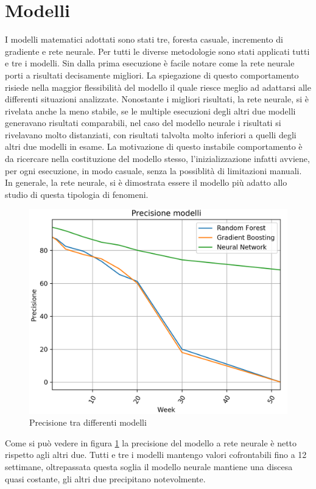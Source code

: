 \documentclass[%
    corpo=12pt,
    twoside,
    oldstyle,
    autoretitolo,
    greek,
    evenboxes,
]{toptesi}
\begin{document}
\section{Modelli}
I modelli matematici adottati sono stati tre, foresta casuale, incremento di gradiente e rete neurale. Per tutti le diverse metodologie sono stati applicati tutti e tre i modelli. Sin dalla prima esecuzione è facile notare come la rete neurale porti a risultati decisamente migliori. La spiegazione di questo comportamento risiede nella maggior flessibilità del modello il quale riesce meglio ad adattarsi alle differenti situazioni analizzate. Nonostante i migliori risultati, la rete neurale, si è rivelata anche la meno stabile, se le multiple esecuzioni degli altri due modelli generavano risultati comparabili, nel caso del modello neurale i risultati si rivelavano molto distanziati, con risultati talvolta molto inferiori a quelli degli altri due modelli in esame. La motivazione di questo instabile comportamento è da ricercare nella costituzione del modello stesso, l'inizializzazione infatti avviene, per ogni esecuzione, in modo casuale, senza la possiblità di limitazioni manuali. In generale, la rete neurale, si è dimostrata essere il modello più adatto allo studio di questa tipologia di fenomeni.
\begin{figure}[!ht]
  \includegraphics[width=\linewidth]{figure/andamento_modelli.png}
  \caption{Precisione tra differenti modelli}
  \label{fig:andamento_modelli}
\end{figure}
Come si può vedere in figura \ref{fig:andamento_modelli} la precisione del modello a rete neurale è netto rispetto agli altri due. Tutti e tre i modelli mantengo valori cofrontabili fino a 12 settimane, oltrepassata questa soglia il modello neurale mantiene una discesa quasi costante, gli altri due precipitano notevolmente.
\end{document}
